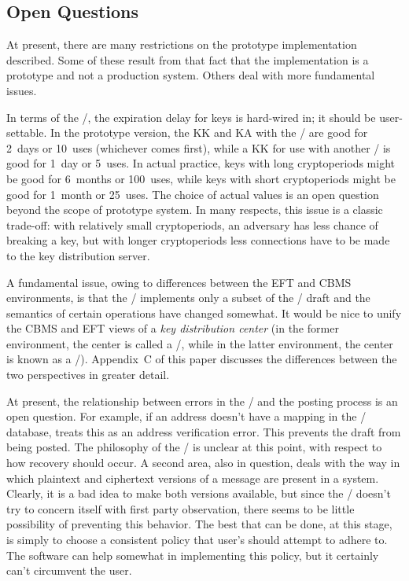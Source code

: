 \subsection{Open Questions}
At present, there are many restrictions on the prototype implementation
described.
Some of these result from that fact that the implementation is a prototype
and not a production system.
Others deal with more fundamental issues.

In terms of the \TMA/,
the expiration delay for keys is hard-wired in;
it should be user-settable.
In the prototype version,
the KK and KA with the \KDS/ are good for 2~days or 10~uses
(whichever comes first),
while a KK for use with another \TMA/ is good for 1~day or 5~uses.
In actual practice,
keys with long cryptoperiods might be good for 6~months or 100~uses,
while keys with short cryptoperiods might be good for 1~month or 25~uses.
The choice of actual values is an open question
beyond the scope of prototype system.%
In many respects, this issue is a classic trade-off:
with relatively small cryptoperiods,
an adversary has less chance of breaking a key,
but with longer cryptoperiods less connections have to be made to the key
distribution server.

A fundamental issue,
owing to differences between the EFT and CBMS environments,
is that the \KDS/ implements only a subset of the \ansi/ draft
and the semantics of certain operations have changed somewhat.
It would be nice to unify the CBMS and EFT views
of a {\it key distribution center}
(in the former environment, the center is called a \KDC/,
while in the latter environment, the center is known as a \CKD/).
Appendix~C of this paper discusses the differences between the two
perspectives in greater detail.

At present,
the relationship between errors in the \TMA/ and the posting process is an
open question.
For example,
if an address doesn't have a mapping in the \TMA/ database,
 treats this as an address verification error.
This prevents the draft from being posted.
The philosophy of the \UA/ is unclear at this point,
with respect to how recovery should occur.
A second area, also in question, deals with the way in which plaintext and
ciphertext versions of a message are present in a system.
Clearly, it is a bad idea to make both versions available,
but since the \TMA/ doesn't try to concern itself with first party
observation,
there seems to be little possibility of preventing this behavior.
The best that can be done,
at this stage,
is simply to choose a consistent policy that user's should attempt to adhere
to.
The software can help somewhat in implementing this policy,
but it certainly can't circumvent the user.

